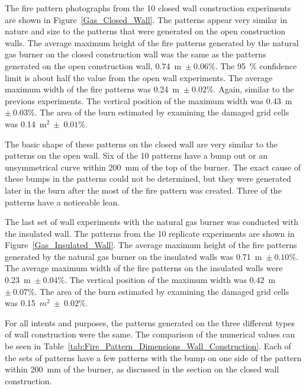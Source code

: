 \documentclass[twoside]{uocthesis}
\begin{document}
{The fire pattern photographs from the 10 closed wall construction experiments are shown in Figure~\ref{Gas_Closed_Wall}. The patterns appear very similar in nature and size to the patterns that were generated on the open construction walls.  The average maximum height of the fire patterns generated by the natural gas burner on the closed construction wall was the same as the patterns generated on the open construction wall, 0.74~m~$\pm~0.06\%$.  The 95~$\%$ confidence limit is about half the value from the open wall experiments. The average maximum width of the fire patterns was 0.24~m~$\pm~0.02\%$.  Again, similar to the previous experiments. The vertical position of the maximum width was 0.43~m~$\pm~0.03\%$. The area of the burn estimated by examining the damaged grid cells was 0.14~m$^2~\pm~0.01\%$.  

The basic shape of these patterns on the closed wall are very similar to the patterns on the open wall.  Six of the 10 patterns have a bump out or an unsymmetrical curve within 200~mm of the top of the burner.  The exact cause of these bumps in the patterns could not be determined, but they were generated later in the burn after the most of the fire pattern was created. Three of the patterns have a noticeable lean.     

The last set of wall experiments with the natural gas burner was conducted with the insulated wall.  The patterns from the 10 replicate experiments are shown in Figure~\ref{Gas_Insulated_Wall}.  The average maximum height of the fire patterns generated by the natural gas burner on the insulated walls was 0.71~m~$\pm~0.10\%$.  The average maximum width of the fire patterns on the insulated walls were 0.23~m~$\pm~0.04\%$.  The vertical position of the maximum width was 0.42~m~$\pm~0.07\%$. The area of the burn estimated by examining the damaged grid cells was 0.15~$m^2~\pm~0.02\%$.  

For all intents and purposes, the patterns generated on the three different types of wall construction were the same.  The comparison of the numerical values can be seen in Table~\ref{tab:Fire_Pattern_Dimensions_Wall_Construction}.  Each of the sets of patterns have a few patterns with the bump on one side of the pattern within 200~mm of the burner, as discussed in the section on the closed wall construction. 

}
\end{document}
